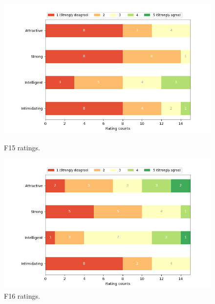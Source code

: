 \begin{figure}[H]
  \includegraphics[width=\linewidth]{Survey/FRatings/avatar_f15.png}
  \caption{F15 ratings.}
\endminipage\hfill
{}
  \includegraphics[width=\linewidth]{Survey/FRatings/avatar_f16.png}
  \caption{F16 ratings.}
\endminipage\hfill
\end{figure}
